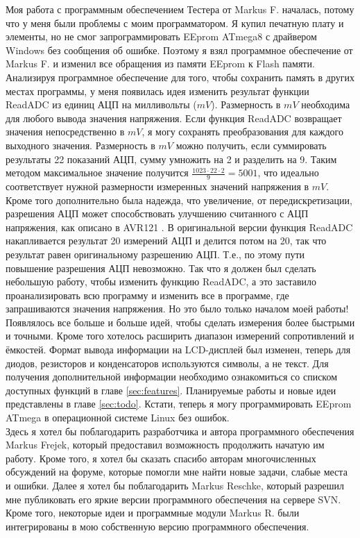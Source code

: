 Моя работа с программным обеспечением Тестера от Markus F.\cite{Frejek} началась, потому что у меня были проблемы с 
моим программатором. Я купил печатную плату и элементы, но не смог запрограммировать EEprom ATmega8 с драйвером Windows 
без сообщения об ошибке. Поэтому я взял программное обеспечение от Markus F. и изменил все обращения из памяти EEprom 
к Flash памяти. Анализируя программное обеспечение для того, чтобы сохранить память в других местах программы, у меня 
появилась идея изменить результат функции ReadADC из единиц АЦП на милливольты (\(mV\)). Размерность в \(mV\) необходима 
для любого вывода значения напряжения. Если функция ReadADC возвращает значения непосредственно в \(mV\), я могу 
сохранять преобразования для каждого выходного значения. Размерность в \(mV\) можно получить, если суммировать 
результаты 22 показаний АЦП, сумму умножить на 2 и разделить на 9. Таким методом максимальное значение получится 
\begin{math}\frac{1023\cdot22\cdot2}{9} = 5001\end{math},  что идеально соответствует нужной размерности измеренных 
значений напряжения в \(mV\). Кроме того дополнительно была надежда, что увеличение, от передискретизации, 
разрешения АЦП может способствовать улучшению считанного с АЦП напряжения, как описано в AVR121 \cite{AVR121}. 
В оригинальной версии функция ReadADC накапливается результат 20 измерений АЦП и делится потом на 20, так что результат 
равен оригинальному разрешению АЦП. Т.е., по этому пути повышение разрешения АЦП невозможно. Так что я должен был 
сделать небольшую работу, чтобы изменить функцию ReadADC, а это заставило проанализировать всю программу и изменить все 
 в программе, где запрашиваются значения напряжения. Но это было только началом моей работы!\\

Появлялось все больше и больше идей, чтобы сделать измерения более быстрыми и точными. Кроме того хотелось расширить 
диапазон измерений сопротивлений и ёмкостей. Формат вывода информации на LCD-дисплей был изменен, теперь для диодов, 
резисторов и конденсаторов используются символы, а не текст. Для получения дополнительной информации необходимо 
ознакомиться со списком доступных функций в главе \ref{sec:features}. Планируемые работы и новые идеи представлены 
в главе \ref{sec:todo}. Кстати, теперь я могу программировать EEprom ATmega в операционной системе Linux без ошибок.\\

Здесь я хотел бы поблагодарить разработчика и автора программного обеспечения Markus Frejek, который предоставил 
возможность продолжить начатую им работу. Кроме того, я хотел бы сказать спасибо авторам многочисленных обсуждений 
на форуме, которые помогли мне найти новые задачи, слабые места и ошибки. Далее я хотел бы поблагодарить Markus 
Reschke, который разрешил мне публиковать его яркие версии программного обеспечения на сервере SVN. 
Кроме того, некоторые идеи и программные модули Markus R. были интегрированы в мою собственную версию программного 
обеспечения.

